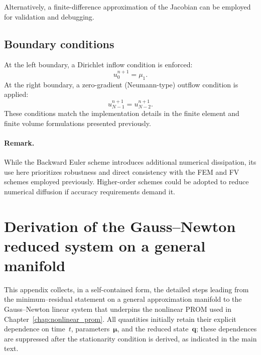 Alternatively, a finite-difference approximation of the Jacobian can be employed for validation and debugging.


\subsection{Boundary conditions}

At the left boundary, a Dirichlet inflow condition is enforced:
\begin{equation}
u_0^{n+1}=\mu_1.\end{equation}
At the right boundary, a zero-gradient (Neumann-type) outflow condition is applied:
\begin{equation}
u_{N-1}^{n+1}=u_{N-2}^{n+1}.\end{equation}
These conditions match the implementation details in the finite element and finite volume formulations presented previously.

\paragraph{Remark.} While the Backward Euler scheme introduces additional numerical dissipation, its use here prioritizes robustness and direct consistency with the FEM and FV schemes employed previously. Higher-order schemes could be adopted to reduce numerical diffusion if accuracy requirements demand it.

\section{Derivation of the Gauss--Newton reduced system on a general manifold}
\label{app:gauss_newton_manifold}

This appendix collects, in a self-contained form, the detailed steps leading  
from the minimum–residual statement on a general approximation manifold to the
Gauss–Newton linear system that underpins the nonlinear PROM used in
Chapter~\ref{chap:nonlinear_prom}.  All quantities initially retain their
explicit dependence on time~\(t\), parameters~\(\boldsymbol{\mu}\), and the
reduced state~\(\mathbf{q}\); these dependences are suppressed after the
stationarity condition is derived, as indicated in the main text.

